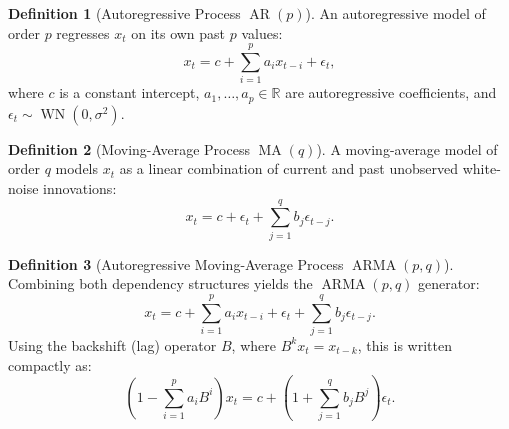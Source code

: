 \documentclass[11pt,a4paper]{article}
\theoremstyle{definition}
\newtheorem{definition}{Definition}[section]
\theoremstyle{plain}
\begin{document}
\begin{definition}[Autoregressive Process $\operatorname{AR}(p)$]
An autoregressive model of order $p$ regresses $x_t$ on its own past $p$ values:
\begin{equation}
    x_t = c + \sum_{i=1}^p a_i x_{t-i} + \epsilon_t,
\end{equation}
where $c$ is a constant intercept, $a_1, \dots, a_p \in \mathbb{R}$ are autoregressive coefficients, and $\epsilon_t \sim \operatorname{WN}(0, \sigma^2)$.
\end{definition}

\begin{definition}[Moving-Average Process $\operatorname{MA}(q)$]
A moving-average model of order $q$ models $x_t$ as a linear combination of current and past unobserved white-noise innovations:
\begin{equation}
    x_t = c + \epsilon_t + \sum_{j=1}^q b_j \epsilon_{t-j}.
\end{equation}
\end{definition}

\begin{definition}[Autoregressive Moving-Average Process $\operatorname{ARMA}(p, q)$]
Combining both dependency structures yields the $\operatorname{ARMA}(p, q)$ generator:
\begin{equation}
    x_t = c + \sum_{i=1}^p a_i x_{t-i} + \epsilon_t + \sum_{j=1}^q b_j \epsilon_{t-j}.
\end{equation}
Using the backshift (lag) operator $B$, where $B^k x_t = x_{t-k}$, this is written compactly as:
\begin{equation}
    \left(1 - \sum_{i=1}^p a_i B^i\right) x_t = c + \left(1 + \sum_{j=1}^q b_j B^j\right) \epsilon_t.
\end{equation}
\end{definition}
\end{document}
